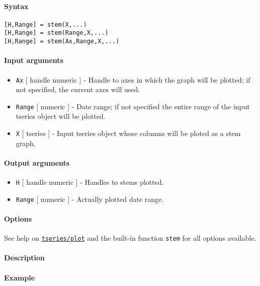 


	\paragraph{Syntax}

\begin{verbatim}
[H,Range] = stem(X,...)
[H,Range] = stem(Range,X,...)
[H,Range] = stem(Ax,Range,X,...)
\end{verbatim}

\paragraph{Input arguments}

\begin{itemize}
\item
  \texttt{Ax} {[} handle \textbar{} numeric {]} - Handle to axes in
  which the graph will be plotted; if not specified, the current axes
  will used.
\item
  \texttt{Range} {[} numeric {]} - Date range; if not specified the
  entire range of the input tseries object will be plotted.
\item
  \texttt{X} {[} tseries {]} - Input tseries object whose columns will
  be ploted as a stem graph.
\end{itemize}

\paragraph{Output arguments}

\begin{itemize}
\item
  \texttt{H} {[} handle \textbar{} numeric {]} - Handles to stems
  plotted.
\item
  \texttt{Range} {[} numeric {]} - Actually plotted date range.
\end{itemize}

\paragraph{Options}

See help on \href{tseries/plot}{\texttt{tseries/plot}} and the built-in
function \texttt{stem} for all options available.

\paragraph{Description}

\paragraph{Example}


